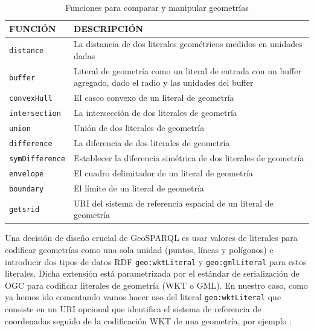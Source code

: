 \begin{table}[H]
	\caption{Funciones para comparar y manipular geometrías}
	\label{funciones-geosparql}
	\centering
	\begin{tabular}{|l|m{8.6cm}|}
		\hline
		\rowcolor[HTML]{EFEFEF} 
		{\textbf{FUNCIÓN} } & {\textbf{DESCRIPCIÓN}} \\ \hline
		\texttt{distance}		&       La distancia de dos literales geométricos medidos en unidades dadas                  \\ \hline
		\texttt{buffer} &           Literal de geometría como un literal de entrada con un buffer agregado, dado el radio y las unidades del buffer              \\ \hline
		\texttt{convexHull}	&      El casco convexo de un literal de geometría                   \\ \hline
		\texttt{intersection} &          La intersección de dos literales de geometría               \\ \hline
		\texttt{union}		&     Unión de dos literales de geometría                    \\ \hline
		\texttt{difference} &       La diferencia de dos literales de geometría                  \\ \hline
		\texttt{symDifference}	&      Establecer la diferencia simétrica de dos literales de geometría                  \\ \hline
		\texttt{envelope}  &              El cuadro delimitador de un literal de geometría           \\ \hline
		\texttt{boundary}		&    El límite de un literal de geometría                     \\ \hline
		\texttt{getsrid} &       URI del sistema de referencia espacial de un literal de geometría                  \\ \hline		
	\end{tabular}
\end{table}

Una decisión de diseño crucial de GeoSPARQL es usar valores de literales para codificar geometrías como una sola unidad (puntos, líneas y polígonos) e introducir dos tipos de datos RDF \texttt{geo:wktLiteral} y \texttt{geo:gmlLiteral} para estos literales. Dicha extensión está parametrizada por el estándar de serialización de OGC para codificar literales de geometría (WKT o GML). En nuestro caso, como ya hemos ido comentando vamos hacer uso del literal  \texttt{geo:wktLiteral} que consiste en un URI opcional que identifica el sistema de referencia de coordenadas seguido de la codificación WKT de una geometría, por ejemplo \cite{wkt-database}: 

